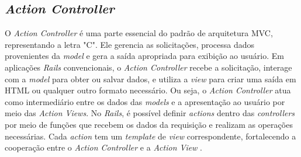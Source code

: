 \subsection{\textit{Action Controller}}

O \textit{Action Controller} é uma parte essencial do padrão de arquitetura MVC, representando a letra "C". Ele gerencia as solicitações, processa dados provenientes da \textit{model} e gera a saída apropriada para exibição ao usuário. Em aplicações \textit{Rails} convencionais, o \textit{Action Controller} recebe a solicitação, interage com a \textit{model} para obter ou salvar dados, e utiliza a \textit{view} para criar uma saída em HTML ou qualquer outro formato necessário. Ou seja, o \textit{Action Controller} atua como intermediário entre os dados das \textit{models} e a apresentação ao usuário por meio das \textit{Action Views}. No \textit{Rails}, é possível definir \textit{actions} dentro das \textit{controllers} por meio de funções que recebem os dados da requisição e realizam as operações necessárias. Cada \textit{action} tem um \textit{template} de \textit{view} correspondente, fortalecendo a cooperação entre o \textit{Action Controller} e a \textit{Action View} \cite{actioncontroller-overview}.
